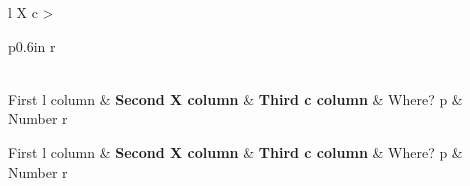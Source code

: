 \documentclass[phd,showframe]{ndsu-thesis-2022}
\begin{document}
\begin{landscape}
\begingroup%
\newcommand{\tf}{\textcolor{magenta}{Auto full-width X column:} It remains a mystery why, then, the discipline of human reason, in other words, is what first gives rise to nothing!}

\newcommand{\heads}{%
\toprule
First l column & \textbf{Second X column} & \textbf{Third c column} & Where? p & Number r\\
    \midrule
}

\footnotesize
\renewcommand{\arraystretch}{2}%
\begin{spacing}{0.8}

\begin{xltabular}{1.346\textwidth}{l X c >{\raggedright\arraybackslash}p{0.6in} r}
\caption{Landscape longtable using xltabular package illustrating the regular \texttt{l, c, r, p} and automatic \texttt{X} columns with no repeating head.}             %
\label{tab:xltabularls}\\

\heads
\endfirsthead

\heads
\endhead

\midrule[0.1pt] 
\endfoot

\\[-0.6in]%
 \\[-0.45in]
\endlastfoot


\end{xltabular}
\end{spacing}
\end{landscape}
\end{document}
